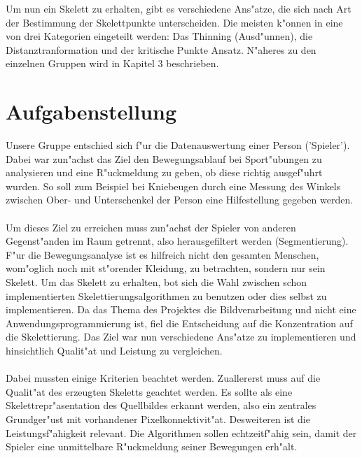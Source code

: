 Um nun ein Skelett zu erhalten, gibt es verschiedene Ans"atze, die sich nach Art der Bestimmung der Skelettpunkte unterscheiden. Die meisten k"onnen in eine von drei Kategorien eingeteilt werden: Das Thinning (Ausd"unnen), die Distanztranformation und der kritische Punkte Ansatz. N"aheres zu den einzelnen Gruppen wird in Kapitel 3 beschrieben.


\section{Aufgabenstellung}
\label{aufgabenstellung}
Unsere Gruppe entschied sich f"ur die Datenauswertung einer Person ('Spieler'). Dabei war zun"achst das Ziel den Bewegungsablauf bei Sport"ubungen zu analysieren und eine R"uckmeldung zu geben, ob diese richtig ausgef"uhrt wurden. So soll zum Beispiel bei Kniebeugen durch eine Messung des Winkels zwischen Ober- und Unterschenkel der Person eine Hilfestellung gegeben werden. \\ \\ 
Um dieses Ziel zu erreichen muss zun"achst der Spieler von anderen Gegenst"anden im Raum getrennt, also herausgefiltert werden (Segmentierung). F"ur die Bewegungsanalyse ist es hilfreich nicht den gesamten Menschen, wom"oglich noch mit st"orender Kleidung, zu betrachten, sondern nur sein Skelett. Um das Skelett zu erhalten, bot sich die Wahl zwischen schon implementierten Skelettierungsalgorithmen zu benutzen oder dies selbst zu implementieren. Da das Thema des Projektes die Bildverarbeitung und nicht eine Anwendungsprogrammierung ist, fiel die Entscheidung auf die Konzentration auf die Skelettierung. Das Ziel war nun verschiedene Ans"atze zu implementieren und hinsichtlich Qualit"at und Leistung zu vergleichen.  \\ \\
Dabei mussten einige Kriterien beachtet werden. Zuallererst muss auf die Qualit"at des erzeugten Skeletts geachtet werden. Es sollte als eine Skelettrepr"asentation des Quellbildes erkannt werden, also ein zentrales Grundger"ust mit vorhandener Pixelkonnektivit"at. Desweiteren ist die Leistungsf"ahigkeit relevant. Die Algorithmen sollen echtzeitf"ahig sein, damit der Spieler eine unmittelbare R"uckmeldung seiner Bewegungen erh"alt.
